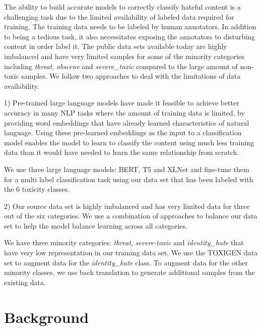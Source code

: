 \documentclass[11pt,a4paper]{article}
\begin{document}

The ability to build accurate models to correctly classify hateful content is a challenging task due to the limited availability of labeled data required for training. The training data needs to be labeled by human annotators. In addition to being a tedious task, it also necessitates exposing the annotators to  disturbing content in order label it. The public data sets available today are highly imbalanced and have very limited samples for some of the minority categories including \emph{threat}, \emph{obscene} and \emph{severe\_toxic} compared to the large amount of non-toxic samples. We follow two approaches to deal with the limitations of data availability.

1) Pre-trained large language models have made it feasible to achieve better accuracy  in many NLP tasks where the amount of training data is limited, by providing word embeddings that have already learned characteristics of natural language. Using these pre-learned embeddings as the input to a classification model enables the model to learn to classify the content using much less training data than it would have needed to learn the same relationship from scratch.

We use three large language models: BERT, T5 and XLNet and fine-tune them for a multi label classification task using our data set that has been labeled with the 6 toxicity classes. 

2) Our source data set is highly imbalanced and has very limited data for three out of the six categories. We use a combination of approaches to balance our data set to help the model balance learning across all categories.

We have three minority categories: \emph{threat}, \emph{severe-toxic} and \emph{identity\_hate} that have very low representation in our training data set. We use the TOXIGEN \cite{hartvigsen2022toxigen} data set to augment data for the \emph{identity\_hate} class. To augment data for the other minority classes, we use back translation to generate additional samples from the existing data. 


\section{Background}
\end{document}
